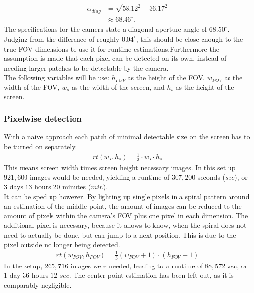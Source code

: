 \documentclass[journal,final,a4paper,twoside]{PS}
\begin{document}
\begin{align}\begin{split}
\alpha_{diag} &= \sqrt{58.12^2 + 36.17^2} \\& \approx 68.46^{\circ}.\end{split}
\end{align}
The specifications for the camera state a diagonal aperture angle of $68.50^{\circ}$. Judging from the difference of roughly $0.04^{\circ}$, this should be close enough to the true FOV dimensions to use it for runtime estimations.Furthermore the assumption is made that each pixel can be detected on its own, instead of needing larger patches to be detectable by the camera.\\
The following variables will be use: $h_{FOV}$ as the height of the FOV, $w_{FOV}$ as the width of the FOV, $w_s$ as the width of the screen, and $h_s$ as the height of the screen.\\
\subsubsection{Pixelwise detection}
\label{singlePixel}
With a naive approach each patch of minimal detectable size on the screen has to be turned on separately.
\begin{align}
rt(w_s, h_s) = \frac{1}{3} \cdot w_s \cdot h_s
\end{align}
This means screen width times screen height necessary images. In this set up $921,600$ images would be needed, yielding a runtime of $307,200$ seconds ($sec$), or $3$ days $13$ hours $20$ minutes ($min$).\\
It can be sped up however. By lighting up single pixels in a spiral pattern around an estimation of the middle point, the amount of images can be reduced to the amount of pixels within the camera’s FOV plus one pixel in each dimension. The additional pixel is necessary, because it allows to know, when the spiral does not need to actually be done, but can jump to a next position. This is due to the pixel outside no longer being detected. \begin{align}
rt(w_{FOV}, h_{FOV}) = \frac{1}{3} (w_{FOV} + 1) \cdot (h_{FOV} + 1)
\end{align}
In the setup, $265,716$ images were needed, leading to a runtime of $88,572$ $sec$, or $1$ day $36$ hours $12$ $sec$. The center point estimation has been left out, as it is comparably negligible.\\
	
\end{document}

